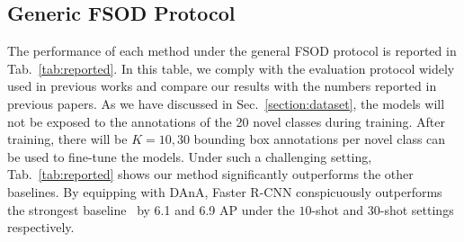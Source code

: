 \documentclass[journal]{IEEEtran}
\begin{document}
\subsection{Generic FSOD Protocol}
The performance of each method under the general FSOD protocol is reported in Tab.~\ref{tab:reported}.
In this table, we comply with the evaluation protocol widely used in previous works and compare our results with the numbers reported in previous papers.  
As we have discussed in Sec.~\ref{section:dataset}, the models will not be exposed to the annotations of the 20 novel classes during training.
After training, there will be $K=10, 30$ bounding box annotations per novel class can be used to fine-tune the models.
Under such a challenging setting, Tab.~\ref{tab:reported} shows our method significantly outperforms the other baselines.
By equipping with DAnA, Faster R-CNN conspicuously outperforms the strongest baseline~\cite{xiao2020few} by 6.1 and 6.9 AP under the $10$-shot and $30$-shot settings respectively.


\begin{table}[t!]
    \centering
    \caption{
    The results of PASCAL2COCO evaluation. All the models are trained on PASCAL VOC 2007 and tested on COCO 2014. In this setting, the base domain denotes the 20 classes shared between PASCAL VOC and COCO, while the novel domain denotes the other 60 classes in the COCO dataset.
    }
    \label{tab:pascal2coco}
\end{table}
\end{document}
